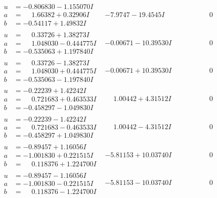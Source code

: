 \documentclass[1p]{elsarticle_modified}
\theoremstyle{definition}
\begin{document}
$$\begin{array}{c|c|c}
\begin{aligned}
u &= -0.806830 - 1.155070 I \\
a &= \phantom{-}1.66382 + 0.32906 I \\
b &= -0.54117 + 1.49832 I\end{aligned}
 & -7.9747 - 19.4545 I & \phantom{-0.000000 } 0 \\ \hline\begin{aligned}
u &= \phantom{-}0.33726 + 1.38273 I \\
a &= \phantom{-}1.048030 - 0.444775 I \\
b &= -0.535063 + 1.197840 I\end{aligned}
 & -0.00671 - 10.39530 I & \phantom{-0.000000 } 0 \\ \hline\begin{aligned}
u &= \phantom{-}0.33726 - 1.38273 I \\
a &= \phantom{-}1.048030 + 0.444775 I \\
b &= -0.535063 - 1.197840 I\end{aligned}
 & -0.00671 + 10.39530 I & \phantom{-0.000000 } 0 \\ \hline\begin{aligned}
u &= -0.22239 + 1.42242 I \\
a &= \phantom{-}0.721683 + 0.463533 I \\
b &= -0.458297 - 1.049830 I\end{aligned}
 & \phantom{-}1.00442 + 4.31512 I & \phantom{-0.000000 } 0 \\ \hline\begin{aligned}
u &= -0.22239 - 1.42242 I \\
a &= \phantom{-}0.721683 - 0.463533 I \\
b &= -0.458297 + 1.049830 I\end{aligned}
 & \phantom{-}1.00442 - 4.31512 I & \phantom{-0.000000 } 0 \\ \hline\begin{aligned}
u &= -0.89457 + 1.16056 I \\
a &= -1.001830 + 0.221515 I \\
b &= \phantom{-}0.118376 + 1.224700 I\end{aligned}
 & -5.81153 + 10.03740 I & \phantom{-0.000000 } 0 \\ \hline\begin{aligned}
u &= -0.89457 - 1.16056 I \\
a &= -1.001830 - 0.221515 I \\
b &= \phantom{-}0.118376 - 1.224700 I\end{aligned}
 & -5.81153 - 10.03740 I & \phantom{-0.000000 } 0 \\ \hline\begin{aligned}

\end{aligned}
\end{array}$$
\end{document}
